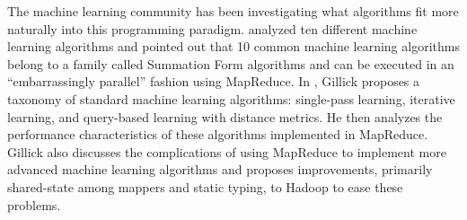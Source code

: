 The machine learning community has been investigating what algorithms fit more naturally into this programming paradigm. \cite{MapReduceML} analyzed ten different machine learning algorithms and pointed out that 10 common machine learning algorithms belong to a family called Summation Form algorithms and can be executed in an ``embarrassingly parallel'' fashion using MapReduce. In \cite{Gillick}, Gillick proposes a taxonomy of standard machine learning algorithms: single-pass learning, iterative learning, and query-based learning with distance metrics. He then analyzes the performance characteristics of these algorithms implemented in MapReduce. Gillick also discusses the complications of using MapReduce to implement more advanced machine learning algorithms and proposes improvements, primarily shared-state among mappers and static typing, to Hadoop to ease these problems.

